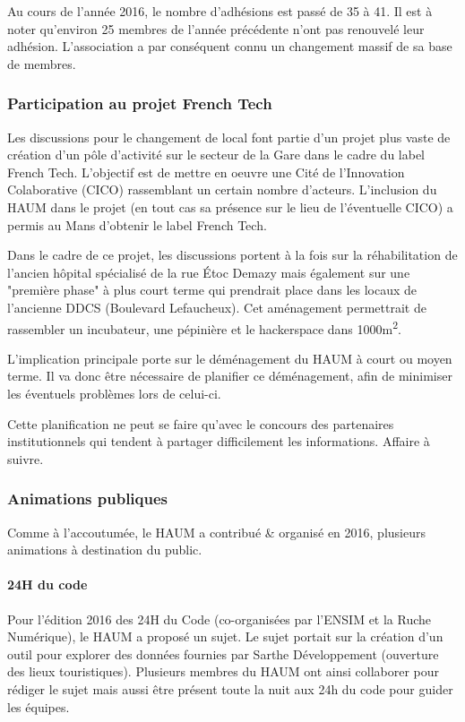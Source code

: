 \documentclass[a4paper, 11pt]{article}
\begin{document}
Au cours de l'année 2016, le nombre d'adhésions est passé de 35 à 41.
Il est à noter qu'environ 25 membres de l'année précédente n'ont pas renouvelé leur adhésion. L'association a par conséquent connu un changement massif de sa base de membres.

\subsubsection{Participation au projet French Tech}

Les discussions pour le changement de local font partie d'un projet plus vaste de création d'un pôle d'activité sur le secteur de la Gare dans le cadre du label French Tech. L'objectif est de mettre en oeuvre une Cité de l'Innovation Colaborative (CICO) rassemblant un certain nombre d'acteurs. L'inclusion du HAUM dans le projet (en tout cas sa présence sur le lieu de l'éventuelle CICO) a permis au Mans d'obtenir le label French Tech.

Dans le cadre de ce projet, les discussions portent à la fois sur la réhabilitation de l'ancien hôpital spécialisé de la rue Étoc Demazy mais également sur une "première phase" à plus court terme qui prendrait place dans les locaux de l'ancienne DDCS (Boulevard Lefaucheux). Cet aménagement permettrait de rassembler un incubateur, une pépinière et le hackerspace dans 1000m\textsuperscript{2}.

L'implication principale porte sur le déménagement du HAUM à court ou moyen terme. Il va donc être nécessaire de planifier ce déménagement, afin de minimiser les éventuels problèmes lors de celui-ci.

Cette planification ne peut se faire qu'avec le concours des partenaires institutionnels qui tendent à partager difficilement les informations. Affaire à suivre.

\subsubsection{Animations publiques}

Comme à l'accoutumée, le HAUM a contribué \& organisé en 2016, plusieurs animations à destination du public.

\paragraph{24H du code} Pour l'édition 2016 des 24H du Code (co-organisées par l'ENSIM et la Ruche Numérique), le HAUM a proposé un sujet. Le sujet portait sur la création d'un outil pour explorer des données fournies par Sarthe Développement (ouverture des lieux touristiques). Plusieurs membres du HAUM ont ainsi collaborer pour rédiger le sujet mais aussi être présent toute la nuit aux 24h du code pour guider les équipes.
\end{document}
